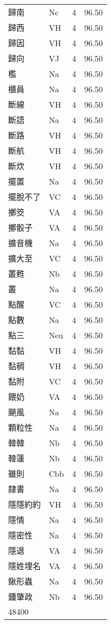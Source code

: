 \documentclass[twocolumn]{book}
\begin{document}
\begin{supertabular}{llrr}
歸南 & Nc & 4 &  96.50\\
歸西 & VH & 4 &  96.50\\
歸因 & VH & 4 &  96.50\\
歸向 & VJ & 4 &  96.50\\
檻 & Na & 4 &  96.50\\
櫃員 & Na & 4 &  96.50\\
斷線 & VH & 4 &  96.50\\
斷語 & Na & 4 &  96.50\\
斷路 & VH & 4 &  96.50\\
斷航 & VH & 4 &  96.50\\
斷炊 & VH & 4 &  96.50\\
擺置 & Na & 4 &  96.50\\
擺脫不了 & VC & 4 &  96.50\\
擲筊 & VA & 4 &  96.50\\
擲骰子 & VA & 4 &  96.50\\
擴音機 & Na & 4 &  96.50\\
擴大至 & VC & 4 &  96.50\\
叢甦 & Nb & 4 &  96.50\\
叢 & Na & 4 &  96.50\\
點醒 & VC & 4 &  96.50\\
點數 & Na & 4 &  96.50\\
點三 & Neu & 4 &  96.50\\
黏黏 & VH & 4 &  96.50\\
黏稠 & VH & 4 &  96.50\\
黏附 & VC & 4 &  96.50\\
餵奶 & VA & 4 &  96.50\\
颶風 & Na & 4 &  96.50\\
顆粒性 & Na & 4 &  96.50\\
韓韓 & Nb & 4 &  96.50\\
韓蓮 & Nb & 4 &  96.50\\
雖則 & Cbb & 4 &  96.50\\
隸書 & Na & 4 &  96.50\\
隱隱約約 & VH & 4 &  96.50\\
隱情 & Na & 4 &  96.50\\
隱密性 & Na & 4 &  96.50\\
隱退 & VA & 4 &  96.50\\
隱姓埋名 & VA & 4 &  96.50\\
鍬形蟲 & Na & 4 &  96.50\\
鍾肇政 & Nb & 4 &  96.50\\
48400\\

\end{supertabular}
\end{document}
